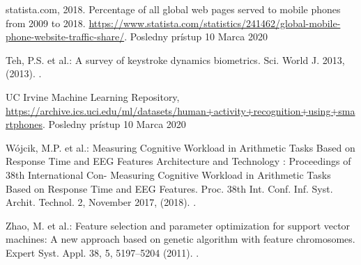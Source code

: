 \documentclass[runningheads]{llncs}
\begin{document}
\begin{thebibliography}{8}
statista.com, 2018. Percentage of all global web pages served to mobile phones from 2009 to 2018. \url{https://www.statista.com/statistics/241462/global-mobile-phone-website-traffic-share/}. Posledny prístup 10 Marca 2020

Teh, P.S. et al.: A survey of keystroke dynamics biometrics. Sci. World J. 2013, (2013). .

UC Irvine Machine Learning Repository, \url{https://archive.ics.uci.edu/ml/datasets/human+activity+recognition+using+smartphones}. Posledny prístup 10 Marca 2020

Wójcik, M.P. et al.: Measuring Cognitive Workload in Arithmetic Tasks Based on Response Time and EEG Features Architecture and Technology : Proceedings of 38th International Con- Measuring Cognitive Workload in Arithmetic Tasks Based on Response Time and EEG Features. Proc. 38th Int. Conf. Inf. Syst. Archit. Technol. 2, November 2017, (2018). .

Zhao, M. et al.: Feature selection and parameter optimization for support vector machines: A new approach based on genetic algorithm with feature chromosomes. Expert Syst. Appl. 38, 5, 5197–5204 (2011). .

\end{thebibliography}
\end{document}
